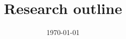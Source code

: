 \documentclass{uva-inf-article}
\title{Research outline}
\date{\today}
\theoremstyle{definition}
\numberwithin{equation}{section}
\begin{document}
\maketitle


\justifying
\begin{multicols}{2}

%
%
%
%
\printbibliography
\end{multicols}




\end{document}
